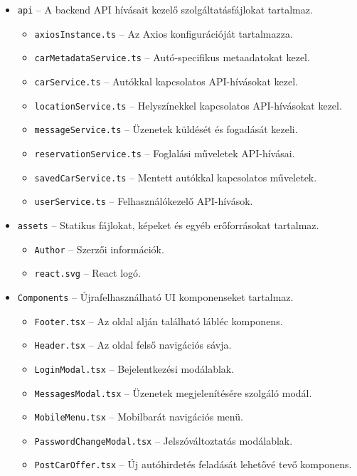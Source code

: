 \documentclass{report}[11pt]
\begin{document}
\begin{itemize}
    \item \texttt{api} – A backend API hívásait kezelő szolgáltatásfájlokat tartalmaz.
    \begin{itemize}
        \item \texttt{axiosInstance.ts} – Az Axios konfigurációját tartalmazza.
        \item \texttt{carMetadataService.ts} – Autó-specifikus metaadatokat kezel.
        \item \texttt{carService.ts} – Autókkal kapcsolatos API-hívásokat kezel.
        \item \texttt{locationService.ts} – Helyszínekkel kapcsolatos API-hívásokat kezel.
        \item \texttt{messageService.ts} – Üzenetek küldését és fogadását kezeli.
        \item \texttt{reservationService.ts} – Foglalási műveletek API-hívásai.
        \item \texttt{savedCarService.ts} – Mentett autókkal kapcsolatos műveletek.
        \item \texttt{userService.ts} – Felhasználókezelő API-hívások.
    \end{itemize}
    \item \texttt{assets} – Statikus fájlokat, képeket és egyéb erőforrásokat tartalmaz.
    \begin{itemize}
        \item \texttt{Author} – Szerzői információk.
        \item \texttt{react.svg} – React logó.
    \end{itemize}
    \item \texttt{Components} – Újrafelhasználható UI komponenseket tartalmaz.
    \begin{itemize}
        \item \texttt{Footer.tsx} – Az oldal alján található lábléc komponens.
        \item \texttt{Header.tsx} – Az oldal felső navigációs sávja.
        \item \texttt{LoginModal.tsx} – Bejelentkezési modálablak.
        \item \texttt{MessagesModal.tsx} – Üzenetek megjelenítésére szolgáló modál.
        \item \texttt{MobileMenu.tsx} – Mobilbarát navigációs menü.
        \item \texttt{PasswordChangeModal.tsx} – Jelszóváltoztatás modálablak.
        \item \texttt{PostCarOffer.tsx} – Új autóhirdetés feladását lehetővé tevő komponens.

\end{itemize}
\end{itemize}
\end{document}

